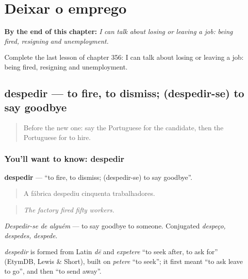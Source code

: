 
\chapter{Deixar o emprego}
\label{ch:pt-deixar-o-emprego}

\begin{chapteropening}
\textbf{By the end of this chapter:} \emph{I can talk about losing or leaving a job: being fired, resigning and unemployment.}

Complete the last lesson of chapter 356: I can talk about losing or leaving a job: being fired, resigning and unemployment.
\end{chapteropening}

\section[despedir]{despedir — to fire, to dismiss; (despedir-se) to say goodbye}

\label{lesson:PT-C356-despedir}



\begin{quote}
Before the new one: say the Portuguese for the candidate, then the Portuguese for to hire.
\end{quote}

\subsection*{You'll want to know: despedir}
\textbf{despedir} — \textquotedblleft{}to fire, to dismiss; (despedir-se) to say goodbye\textquotedblright{}.

\begin{quote}
A fábrica despediu cinquenta trabalhadores.
\end{quote}

\begin{quote}
\emph{The factory fired fifty workers.}
\end{quote}

\emph{Despedir-se de alguém} — to say goodbye to someone. Conjugated \emph{despeço, despedes, despede}.

\begin{cousinweb}
\emph{despedir} is formed from Latin \emph{dē} and \emph{expetere} \textquotedblleft{}to seek after, to ask for\textquotedblright{} (EtymDB, Lewis \& Short), built on \emph{petere} \textquotedblleft{}to seek\textquotedblright{}; it first meant \textquotedblleft{}to ask leave to go\textquotedblright{}, and then \textquotedblleft{}to send away\textquotedblright{}.
\end{cousinweb}

